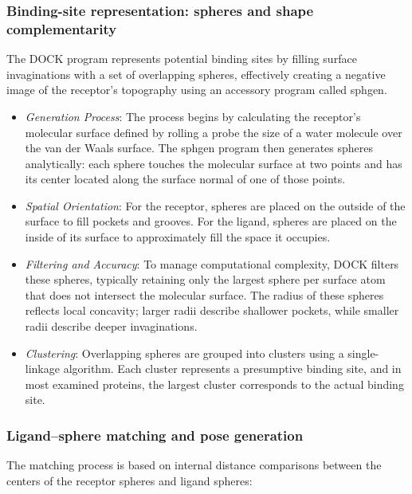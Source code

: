 \documentclass[12pt, a4paper]{article}
\begin{document}
\subsubsection{Binding-site representation: spheres and shape complementarity}


The DOCK program represents potential binding sites by filling surface invaginations with a set of overlapping spheres, effectively creating a negative image of the receptor’s topography using an accessory program called sphgen\cite{CH7_Kuntz1982}. 
\begin{itemize}

\item \textit{Generation Process}: The process begins by calculating the receptor's molecular surface defined by rolling a probe the size of a water molecule over the van der Waals surface. The sphgen program then generates spheres analytically: each sphere touches the molecular surface at two points and has its center located along the surface normal of one of those points.
\item \textit{Spatial Orientation}: For the receptor, spheres are placed on the outside of the surface to fill pockets and grooves. For the ligand, spheres are placed on the inside of its surface to approximately fill the space it occupies.
\item \textit{Filtering and Accuracy}: To manage computational complexity, DOCK filters these spheres, typically retaining only the largest sphere per surface atom that does not intersect the molecular surface. The radius of these spheres reflects local concavity; larger radii describe shallower pockets, while smaller radii describe deeper invaginations.
\item \textit{Clustering}: Overlapping spheres are grouped into clusters using a single-linkage algorithm. Each cluster represents a presumptive binding site, and in most examined proteins, the largest cluster corresponds to the actual binding site. 
\end{itemize}

\subsubsection{Ligand–sphere matching and pose generation}

The matching process is based on internal distance comparisons between the centers of the receptor spheres and ligand spheres\cite{CH7_Kuntz1982,CH7_Shoichet1992Shape}:
\end{document}
